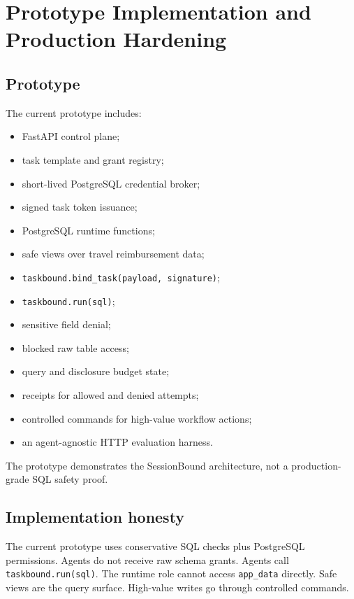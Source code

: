 \documentclass[
]{article}
\providecommand{\tightlist}{%
  \setlength{\itemsep}{0pt}\setlength{\parskip}{0pt}}
\begin{document}
\hypertarget{prototype-implementation-and-production-hardening}{%
\section{Prototype Implementation and Production
Hardening}\label{prototype-implementation-and-production-hardening}}

\hypertarget{prototype}{%
\subsection{Prototype}\label{prototype}}

The current prototype includes:

\begin{itemize}
\tightlist
\item
  FastAPI control plane;
\item
  task template and grant registry;
\item
  short-lived PostgreSQL credential broker;
\item
  signed task token issuance;
\item
  PostgreSQL runtime functions;
\item
  safe views over travel reimbursement data;
\item
  \texttt{taskbound.bind\_task(payload,\ signature)};
\item
  \texttt{taskbound.run(sql)};
\item
  sensitive field denial;
\item
  blocked raw table access;
\item
  query and disclosure budget state;
\item
  receipts for allowed and denied attempts;
\item
  controlled commands for high-value workflow actions;
\item
  an agent-agnostic HTTP evaluation harness.
\end{itemize}

The prototype demonstrates the SessionBound architecture, not a
production-grade SQL safety proof.

\hypertarget{implementation-honesty}{%
\subsection{Implementation
honesty}\label{implementation-honesty}}

The current prototype uses conservative SQL checks plus PostgreSQL
permissions. Agents do not receive raw schema grants. Agents call
\texttt{taskbound.run(sql)}. The runtime role cannot access
\texttt{app\_data} directly. Safe views are the query surface.
High-value writes go through controlled commands.
\end{document}
